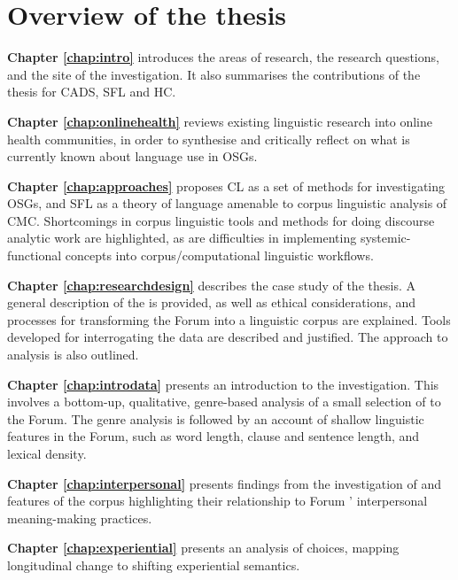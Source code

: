 \section{Overview of the thesis}

\noindent\textbf{Chapter \ref{chap:intro}} introduces the areas of research, the research questions, and the site of the investigation. It also summarises the contributions of the thesis for \gls{CADS}, \gls{SFL} and \gls{HC}.

\noindent\textbf{Chapter \ref{chap:onlinehealth}} reviews existing linguistic research into online health communities, in order to synthesise and critically reflect on what is currently known about language use in \glspl{OSG}.

\noindent\textbf{Chapter \ref{chap:approaches}} proposes \gls{CL} as a set of methods for investigating \glspl{OSG}, and \gls{SFL} as a theory of language amenable to corpus linguistic analysis of \gls{CMC}. Shortcomings in corpus linguistic tools and methods for doing discourse analytic work are highlighted, as are difficulties in implementing systemic\hyp{}functional concepts into corpus\slash computational linguistic workflows.

\noindent\textbf{Chapter \ref{chap:researchdesign}} describes the case study of the thesis. A general description of the  is provided, as well as ethical considerations, and processes for transforming the \gls{Forum} into a linguistic corpus are explained. Tools developed for interrogating the data are described and justified. The approach to analysis is also outlined.

\noindent\textbf{Chapter \ref{chap:introdata}} presents an introduction to the investigation. This involves a bottom\hyp{}up, qualitative, genre\hyp{}based analysis of a small selection of  to the \gls{Forum}. The genre analysis is followed by an account of shallow linguistic features in the \gls{Forum}, such as word length, clause and sentence length, and lexical density.

\noindent\textbf{Chapter \ref{chap:interpersonal}} presents findings from the investigation of  and  features of the \gls{corpus} highlighting their relationship to \gls{Forum} ' interpersonal meaning\hyp{}making practices.

\noindent\textbf{Chapter \ref{chap:experiential}} presents an analysis of  choices, mapping longitudinal change to shifting experiential semantics.

